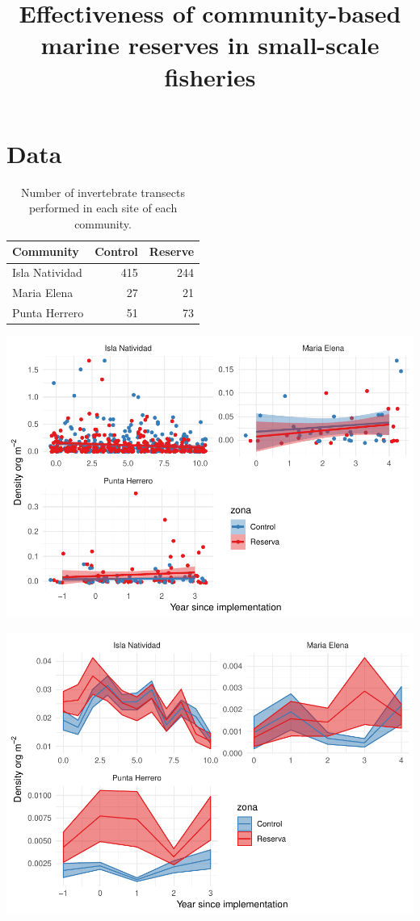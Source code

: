 \documentclass[]{article}
\title{Effectiveness of community-based marine reserves in small-scale
fisheries}
\author{}
\date{}
\begin{document}
\maketitle

{
\setcounter{tocdepth}{2}
\tableofcontents
}
\hypertarget{data}{%
\section{Data}\label{data}}

\begin{table}

\caption{\label{tab:unnamed-chunk-2}Number of invertebrate transects performed in each site of each community.}
\centering
\begin{tabular}[t]{l|r|r}
\hline
Community & Control & Reserve\\
\hline
Isla Natividad & 415 & 244\\
\hline
Maria Elena & 27 & 21\\
\hline
Punta Herrero & 51 & 73\\
\hline
\end{tabular}
\end{table}

\includegraphics{SupplementaryMaterial_files/figure-latex/unnamed-chunk-3-1.pdf}

\includegraphics{SupplementaryMaterial_files/figure-latex/unnamed-chunk-4-1.pdf}
\end{document}
